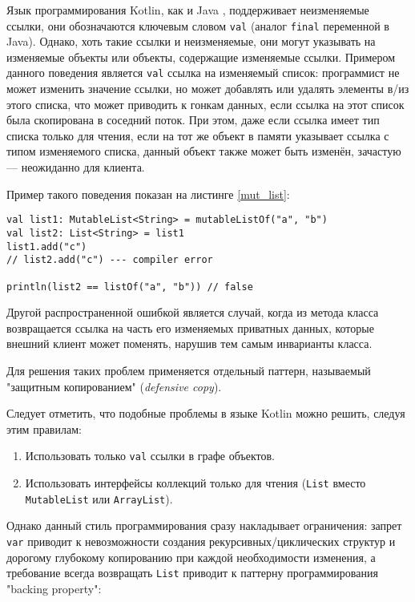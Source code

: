 \documentclass[specification,annotation,times]{itmo-student-thesis}
\begin{document}
Язык программирования Kotlin, как и Java \cite{jvm8-spec}, поддерживает неизменяемые ссылки, они обозначаются ключевым словом \texttt{val} (аналог \texttt{final} переменной в Java). 
Однако, хоть такие ссылки и неизменяемые, они могут указывать на изменяемые объекты или объекты, содержащие изменяемые ссылки.
Примером данного поведения является \texttt{val} ссылка на изменяемый список: программист не может изменить значение ссылки, но может добавлять или удалять элементы в/из этого списка, что может приводить к гонкам данных, если ссылка на этот список была скопирована в соседний поток.
При этом, даже если ссылка имеет тип списка только для чтения, если на тот же объект в памяти указывает ссылка с типом изменяемого списка, данный объект также может быть изменён, зачастую --- неожиданно для клиента.

Пример такого поведения показан на листинге \ref{mut_list}:

\begin{lstlisting}[float=h!,caption={Один список с разными типами ссылок},label={mut_list}]
val list1: MutableList<String> = mutableListOf("a", "b")
val list2: List<String> = list1
list1.add("c")
// list2.add("c") --- compiler error

println(list2 == listOf("a", "b")) // false
\end{lstlisting}

Другой распространенной ошибкой является случай, когда из метода класса возвращается ссылка на часть его изменяемых приватных данных, которые внешний клиент может поменять, нарушив тем самым инварианты класса.

Для решения таких проблем применяется отдельный паттерн, называемый "защитным копированием" (\textit{defensive copy}).

Следует отметить, что подобные проблемы в языке Kotlin можно решить, следуя этим правилам:

\begin{enumerate}
	\item Использовать только \texttt{val} ссылки в графе объектов.
	\item Использовать интерфейсы коллекций только для чтения (\texttt{List} вместо \texttt{MutableList} или \texttt{ArrayList}).
\end{enumerate}

Однако данный стиль программирования сразу накладывает ограничения: запрет \texttt{var} приводит к невозможности создания рекурсивных/циклических структур и дорогому глубокому копированию при каждой необходимости изменения, а требование всегда возвращать \texttt{List} приводит к паттерну программирования "backing property":
\end{document}
